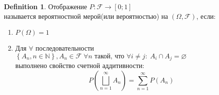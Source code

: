 \documentclass[a4paper]{article}
\theoremstyle{plain}
\theoremstyle{remark}
\theoremstyle{definition}
\newtheorem{definition}{Definition}
\newcommand{\pars}[1]{\left( #1 \right)}
\newcommand{\setN}{\mathbb{N}}
\newcommand{\setF}{\mathcal{F}}
\newcommand{\braces}[1]{\left\{ #1 \right\}} %
\renewcommand{\emptyset}{\varnothing}
\begin{document}
\begin{definition}
	Отображение $P\colon \setF \rightarrow [0;1]$ \\
	называется вероятностной мерой(или вероятностью) на $(\Omega, \setF)$, если:

	\begin{enumerate}
		\item $P(\Omega) = 1$
		\item Для $\forall$ последовательности $\braces{A_n, n \in \setN}, A_n \in \setF \; \forall n
		\text{ такой, что }  \forall i \neq j: \; A_i \cap A_j = \emptyset$ \\ выполнено свойство счетной аддитивности:
		\begin{equation*}
			P\pars{\bigsqcup\limits_{n=1}^{\infty} A_n} = \sum\limits_{n=1}^{\infty} P(A_n)
		\end{equation*}
	\end{enumerate}
\end{definition}

\newpage
\end{document}
